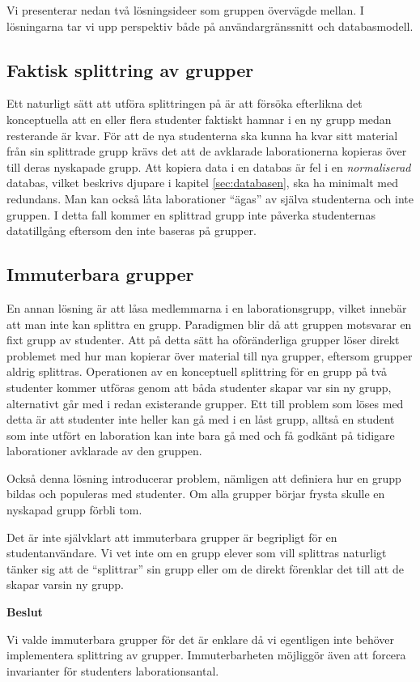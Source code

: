 Vi presenterar nedan två lösningsideer som gruppen övervägde mellan. I lösningarna tar vi upp perspektiv både på användargränssnitt och databasmodell.

\subsection{Faktisk splittring av grupper}
Ett naturligt sätt att utföra splittringen på är att försöka efterlikna det
konceptuella att en eller flera studenter faktiskt hamnar i en ny grupp medan
resterande är kvar. För att de nya studenterna ska kunna ha kvar sitt material
från sin splittrade grupp krävs det att de avklarade laborationerna kopieras
över till deras nyskapade grupp. Att kopiera data i en databas
är fel i en \emph{normaliserad} databas, vilket beskrivs djupare i
kapitel \ref{sec:databasen}, ska ha minimalt med redundans. Man kan också låta
laborationer “ägas” av själva studenterna och inte gruppen. I detta fall kommer
en splittrad grupp inte påverka studenternas datatillgång eftersom den inte
baseras på grupper.

\subsection{Immuterbara grupper}
En annan lösning är att låsa medlemmarna i en laborationsgrupp, vilket innebär att man inte kan splittra en grupp. Paradigmen blir då att gruppen motsvarar en fixt grupp av studenter. Att på detta sätt ha oföränderliga grupper löser direkt problemet med hur man kopierar över material till nya grupper, eftersom grupper aldrig splittras. Operationen av en konceptuell splittring för en grupp på två studenter kommer utföras genom att båda studenter skapar var sin ny grupp, alternativt går med i redan existerande grupper. Ett till problem som löses med detta är att studenter inte heller kan gå med i en låst grupp, alltså en student som inte utfört en laboration kan inte bara gå med och få godkänt på tidigare laborationer avklarade av den gruppen.

Också denna lösning introducerar problem, nämligen att definiera hur en grupp bildas och populeras med studenter. Om alla grupper börjar frysta skulle en nyskapad grupp förbli tom.

Det är inte självklart att immuterbara grupper är begripligt för en studentanvändare.  Vi vet inte om en grupp elever som vill splittras naturligt tänker sig att de “splittrar” sin grupp eller om de direkt förenklar det till att de skapar varsin ny grupp.

\begin{flushright}

  \textbf{Beslut}

  Vi valde immuterbara grupper för det är enklare då vi egentligen inte behöver implementera splittring av grupper. Immuterbarheten möjliggör även att forcera invarianter för studenters laborationsantal.
\end{flushright}
